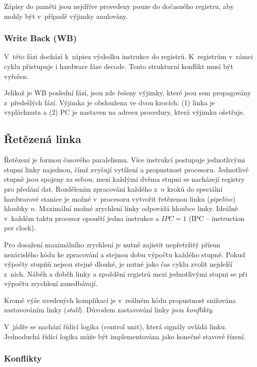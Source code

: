 Zápisy do paměti jsou nejdříve provedeny pouze do dočasného registru, aby mohly být v~případě výjimky anulovány.

\subsubsection{Write Back (WB)}

V~této fázi dochází k~zápisu výsledku instrukce do registrů.
K~registrům v~rámci cyklu přistupuje i hardware fáze decode.
Tento strukturní konflikt musí být vyřešen.

Jelikož je WB poslední fází, jsou zde řešeny výjimky, které jsou sem propagovány z~předešlých fází.
Výjimka je obsloužena ve dvou krocích: (1) linka je vypláchnuta a (2) PC je nastaven na adresu procedury, která výjimku ošetřuje.

\subsection{Řetězená linka}

Řetězení je formou časového paralelismu.
Více instrukcí postupuje jednotlivými stupni linky najednou, čímž zvyšují vytížení a propustnost procesoru.
Jednotlivé stupně jsou spojeny za sebou, mezi každými dvěma stupni se nacházejí registry pro předání dat.
Rozdělením zpracování každého z~$n$ kroků do speciální hardwarové stanice je možné v~procesoru vytvořit řetězenou linku (\emph{pipeline}) hloubky $n$.
Maximální možné zrychlení linky odpovídá hloubce linky.
Ideálně v~každém taktu procesor opouští jedna instrukce a $IPC = 1$ (IPC -- instruction per clock).

Pro dosažení maximálního zrychlení je nutné zajistit nepřetržitý přísun nezávislého kódu ke zpracování a stejnou dobu výpočtu každého stupně.
Pokud výpočty stupňů nejsou stejně dlouhé, je nutné jako čas cyklu zvolit nejdelší z~nich.
Náběh a doběh linky a zpoždění registrů mezi jednotlivými stupni se při výpočtu zrychlení zanedbávají.

Kromě výše uvedených komplikací je v~reálném kódu propustnost snižována zastavováním linky (\emph{stall}).
Důvodem zastavování linky jsou \emph{konflikty}. \cite{OrganizationAndDesign}

V~jádře se nachází řídící logika (control unit), která signály ovládá linku.
Jednoduchá řídící logika může být implementována jako konečné stavové řízení.
\cite{OrganizationAndDesign}

\subsubsection{Konflikty}
\label{konfliktySubSub}

